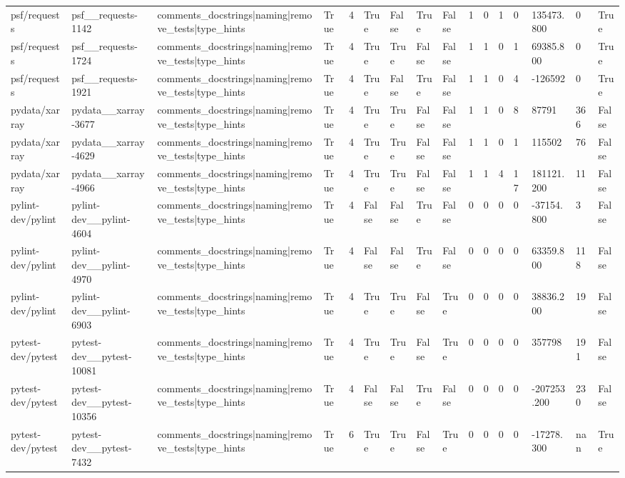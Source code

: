 \begin{tabular}{llllllllllllllll}
psf/requests & psf\_\_requests-1142 & comments\_docstrings|naming|remove\_tests|type\_hints & True & 4 & True & False & True & False & 1 & 0 & 1 & 0 & 135473.800 & 0 & True \\
psf/requests & psf\_\_requests-1724 & comments\_docstrings|naming|remove\_tests|type\_hints & True & 4 & True & True & False & False & 1 & 1 & 0 & 1 & 69385.800 & 0 & True \\
psf/requests & psf\_\_requests-1921 & comments\_docstrings|naming|remove\_tests|type\_hints & True & 4 & True & False & True & False & 1 & 1 & 0 & 4 & -126592 & 0 & True \\
pydata/xarray & pydata\_\_xarray-3677 & comments\_docstrings|naming|remove\_tests|type\_hints & True & 4 & True & True & False & False & 1 & 1 & 0 & 8 & 87791 & 366 & False \\
pydata/xarray & pydata\_\_xarray-4629 & comments\_docstrings|naming|remove\_tests|type\_hints & True & 4 & True & True & False & False & 1 & 1 & 0 & 1 & 115502 & 76 & False \\
pydata/xarray & pydata\_\_xarray-4966 & comments\_docstrings|naming|remove\_tests|type\_hints & True & 4 & True & True & False & False & 1 & 1 & 4 & 17 & 181121.200 & 11 & False \\
pylint-dev/pylint & pylint-dev\_\_pylint-4604 & comments\_docstrings|naming|remove\_tests|type\_hints & True & 4 & False & False & True & False & 0 & 0 & 0 & 0 & -37154.800 & 3 & False \\
pylint-dev/pylint & pylint-dev\_\_pylint-4970 & comments\_docstrings|naming|remove\_tests|type\_hints & True & 4 & False & False & True & False & 0 & 0 & 0 & 0 & 63359.800 & 118 & False \\
pylint-dev/pylint & pylint-dev\_\_pylint-6903 & comments\_docstrings|naming|remove\_tests|type\_hints & True & 4 & True & True & False & True & 0 & 0 & 0 & 0 & 38836.200 & 19 & False \\
pytest-dev/pytest & pytest-dev\_\_pytest-10081 & comments\_docstrings|naming|remove\_tests|type\_hints & True & 4 & True & True & False & True & 0 & 0 & 0 & 0 & 357798 & 191 & False \\
pytest-dev/pytest & pytest-dev\_\_pytest-10356 & comments\_docstrings|naming|remove\_tests|type\_hints & True & 4 & False & False & True & False & 0 & 0 & 0 & 0 & -207253.200 & 230 & False \\
pytest-dev/pytest & pytest-dev\_\_pytest-7432 & comments\_docstrings|naming|remove\_tests|type\_hints & True & 6 & True & True & False & True & 0 & 0 & 0 & 0 & -17278.300 & nan & True \\

\end{tabular}
